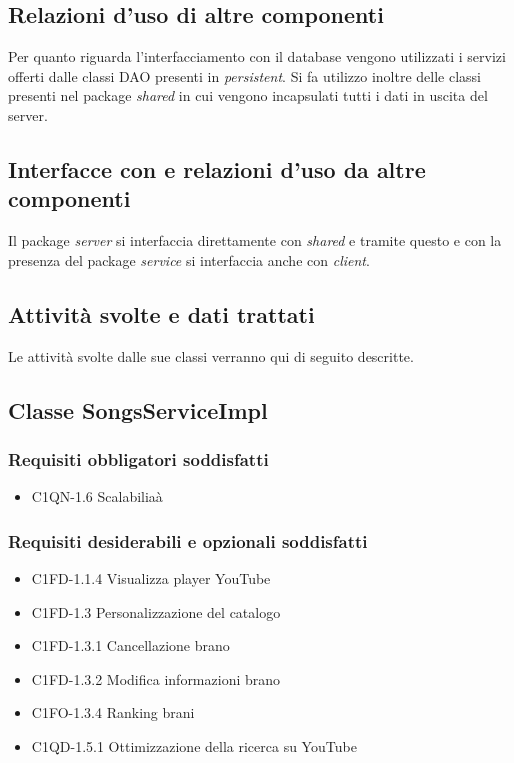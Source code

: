 \subsection*{Relazioni d'uso di altre componenti}
Per quanto riguarda l'interfacciamento con il database vengono utilizzati i
servizi offerti dalle classi DAO presenti in \emph{persistent}. Si fa utilizzo
inoltre delle classi presenti nel package \emph{shared} in cui vengono
incapsulati tutti i dati in uscita del server.
\subsection*{Interfacce con e relazioni d'uso da altre componenti}
Il package \emph{server} si interfaccia direttamente con \emph{shared} e tramite
questo e con la presenza del package \emph{service} si interfaccia anche con
\emph{client}.
\subsection*{Attivit\`a svolte e dati trattati}
Le attivit\`a svolte dalle sue classi verranno qui di seguito descritte.

\subsection{Classe SongsServiceImpl}
\subsubsection*{Requisiti obbligatori soddisfatti}
\begin{itemize}
    \item C1QN-1.6 Scalabilia\`a
\end{itemize}
\subsubsection*{Requisiti desiderabili e opzionali soddisfatti}
\begin{itemize}
    \item C1FD-1.1.4 Visualizza player YouTube
    \item C1FD-1.3 Personalizzazione del catalogo
    \item C1FD-1.3.1 Cancellazione brano
    \item C1FD-1.3.2 Modifica informazioni brano
    \item C1FO-1.3.4 Ranking brani
    \item C1QD-1.5.1 Ottimizzazione della ricerca su YouTube
\end{itemize}
